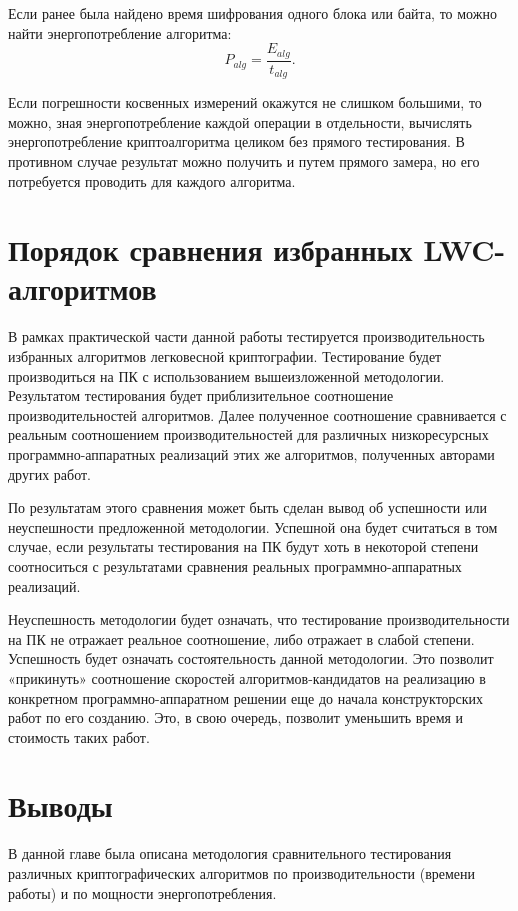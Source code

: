 Если ранее была найдено время шифрования одного блока или байта, то можно найти энергопотребление алгоритма:
\begin{equation}
P_{alg} = \frac{ E_{alg} }{ t_{alg} }.
\end{equation}

Если погрешности косвенных измерений окажутся не слишком большими, то можно, зная энергопотребление каждой операции в отдельности, вычислять энергопотребление криптоалгоритма целиком без прямого тестирования. В противном случае результат можно получить и путем прямого замера, но его потребуется проводить для каждого алгоритма.

\section{Порядок сравнения избранных LWC-алгоритмов} \label{ch3:sec4}

В рамках практической части данной работы тестируется производительность избранных алгоритмов легковесной криптографии. Тестирование будет производиться на ПК с использованием вышеизложенной методологии. Результатом тестирования будет приблизительное соотношение производительностей алгоритмов. Далее полученное соотношение сравнивается с реальным соотношением производительностей для различных низкоресурсных программно-аппаратных реализаций этих же алгоритмов, полученных авторами других работ.

По результатам этого сравнения может быть сделан вывод об успешности или неуспешности предложенной методологии. Успешной она будет считаться в том случае, если результаты тестирования на ПК будут хоть в некоторой степени соотноситься с результатами сравнения реальных программно-аппаратных реализаций.

Неуспешность методологии будет означать, что тестирование производительности на ПК не отражает реальное соотношение, либо отражает в слабой степени. Успешность будет означать состоятельность данной методологии. Это позволит «прикинуть» соотношение скоростей алгоритмов-кандидатов на реализацию в конкретном программно-аппаратном решении еще до начала конструкторских работ по его созданию. Это, в свою очередь, позволит уменьшить время и стоимость таких работ.


\section{Выводы} \label{ch3:conclusion}

В данной главе была описана методология сравнительного тестирования различных криптографических алгоритмов по производительности (времени работы) и по мощности энергопотребления.


%
